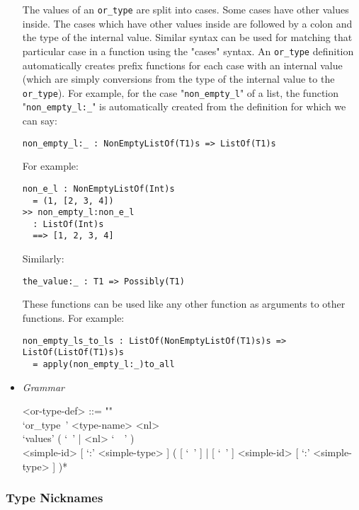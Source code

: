 \documentclass{article}
\begin{document}
\begin{itemize}
The values of an \verb|or_type| are split into cases. Some cases have other
values inside.  The cases which have other values inside are followed by a
colon and the type of the internal value. Similar syntax can be used for
matching that particular case in a function using the "cases" syntax.  An
\verb|or_type| definition automatically creates prefix functions for each
case with an internal value (which are simply conversions from the type of the
internal value to the \verb|or_type|).  For example, for the case
"\verb|non_empty_l|" of a list, the function "\verb|non_empty_l:_|" is
automatically created from the definition for which we can say:
\begin{verbatim}
non_empty_l:_ : NonEmptyListOf(T1)s => ListOf(T1)s
\end{verbatim}
For example:
\begin{verbatim}
non_e_l : NonEmptyListOf(Int)s
  = (1, [2, 3, 4])
>> non_empty_l:non_e_l
  : ListOf(Int)s
  ==> [1, 2, 3, 4]
\end{verbatim}
Similarly:
\begin{verbatim}
the_value:_ : T1 => Possibly(T1)
\end{verbatim}
These functions can be used like any other function as arguments to other
functions.  For example:
\begin{verbatim}
non_empty_ls_to_ls : ListOf(NonEmptyListOf(T1)s)s => ListOf(ListOf(T1)s)s
  = apply(non_empty_l:_)to_all
\end{verbatim}

\item \textit{Grammar}

\begin{grammar}
<or-type-def> ::= ""\\
`or_type\ ' <type-name> <nl> \\
`values' ( `\ ' | <nl> `\ \ ' ) \\ 
<simple-id> [ `:' <simple-type> ]
( [ `\ ' ] | [ `\ ' ] <simple-id> [ `:' <simple-type> ] )*
\end{grammar}

\end{itemize}

\subsubsection{Type Nicknames}
\end{document}
